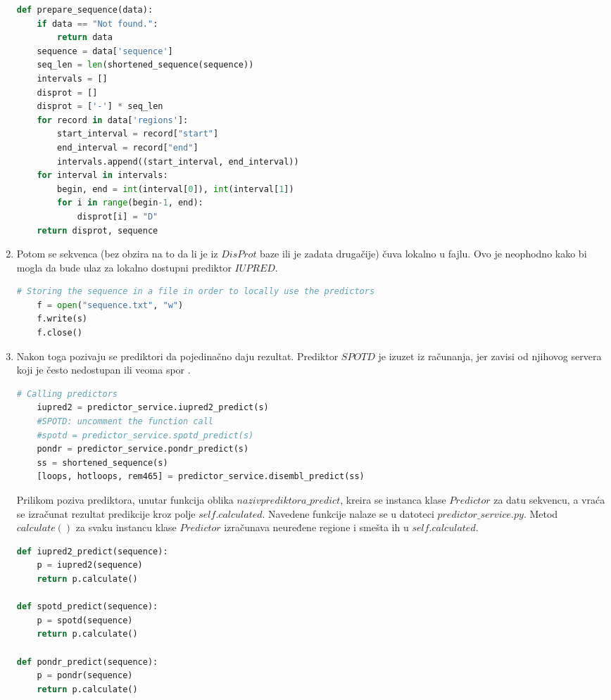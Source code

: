 \begin{enumerate}
\begin{lstlisting}[language=Python]
def prepare_sequence(data):
    if data == "Not found.":
        return data
    sequence = data['sequence']
    seq_len = len(shortened_sequence(sequence)) 
    intervals = []
    disprot = []
    disprot = ['-'] * seq_len
    for record in data['regions']:
        start_interval = record["start"]
        end_interval = record["end"]
        intervals.append((start_interval, end_interval))
    for interval in intervals:
        begin, end = int(interval[0]), int(interval[1])
        for i in range(begin-1, end):
            disprot[i] = "D"
    return disprot, sequence
\end{lstlisting}

\item Potom se sekvenca (bez obzira na to da li je iz $DisProt$ baze ili je zadata drugačije) čuva lokalno u fajlu. Ovo je neophodno kako bi mogla da bude ulaz za lokalno dostupni prediktor $IUPRED$.
\begin{lstlisting}[language=Python]
 # Storing the sequence in a file in order to locally use the predictors
    f = open("sequence.txt", "w")
    f.write(s)
    f.close()
\end{lstlisting}
\item Nakon toga pozivaju se prediktori da pojedinačno daju rezultat. Prediktor $SPOTD$ je izuzet iz računanja, jer zavisi od njihovog servera koji je često nedostupan ili veoma spor	. 
\begin{lstlisting}[language=Python]
# Calling predictors
    iupred2 = predictor_service.iupred2_predict(s)
    #SPOTD: uncomment the function call 
    #spotd = predictor_service.spotd_predict(s) 
    pondr = predictor_service.pondr_predict(s)
    ss = shortened_sequence(s)
    [loops, hotloops, rem465] = predictor_service.disembl_predict(ss)
\end{lstlisting}
Prilikom poziva prediktora, unutar funkcija oblika $nazivprediktora\_predict$, kreira se instanca klase $Predictor$ za datu sekvencu, a vraća se izračunat rezultat predikcije kroz polje $self.calculated$. Navedene funkcije nalaze se u datoteci $predictor\_service.py$. Metod $calculate()$ za svaku instancu klase $Predictor$ izračunava neuređene regione i smešta ih u $self.calculated$.
\begin{lstlisting}[language=Python]
def iupred2_predict(sequence):
    p = iupred2(sequence)
    return p.calculate()

def spotd_predict(sequence):
    p = spotd(sequence)
    return p.calculate()

def pondr_predict(sequence):
    p = pondr(sequence)
    return p.calculate()


\end{lstlisting}
\end{enumerate}
